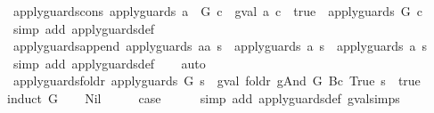 \begin{isabellebody}
\endisatagproof
{\isafoldproof}%
%
\isadelimproof
\isanewline
%
\endisadelimproof
\isanewline
{}\isamarkupfalse%
\ apply{\isacharunderscore}guards{\isacharunderscore}cons{\isacharcolon}\ {\isachardoublequoteopen}apply{\isacharunderscore}guards\ {\isacharparenleft}a\ {\isacharhash}\ G{\isacharparenright}\ c\ {\isacharequal}\ {\isacharparenleft}gval\ a\ c\ {\isacharequal}\ true\ {\isasymand}\ apply{\isacharunderscore}guards\ G\ c{\isacharparenright}{\isachardoublequoteclose}\isanewline
%
\isadelimproof
\ \ %
\endisadelimproof
%
\isatagproof
{}\isamarkupfalse%
\ {\isacharparenleft}simp\ add{\isacharcolon}\ apply{\isacharunderscore}guards{\isacharunderscore}def{\isacharparenright}%
\endisatagproof
{\isafoldproof}%
%
\isadelimproof
\isanewline
%
\endisadelimproof
\isanewline
{}\isamarkupfalse%
\ apply{\isacharunderscore}guards{\isacharunderscore}append{\isacharcolon}\ {\isachardoublequoteopen}apply{\isacharunderscore}guards\ {\isacharparenleft}a{\isacharat}a{\isacharprime}{\isacharparenright}\ s\ {\isacharequal}\ {\isacharparenleft}apply{\isacharunderscore}guards\ a\ s\ {\isasymand}\ apply{\isacharunderscore}guards\ a{\isacharprime}\ s{\isacharparenright}{\isachardoublequoteclose}\isanewline
%
\isadelimproof
\ \ %
\endisadelimproof
%
\isatagproof
{}\isamarkupfalse%
\ {\isacharparenleft}simp\ add{\isacharcolon}\ apply{\isacharunderscore}guards{\isacharunderscore}def{\isacharparenright}\isanewline
\ \ \isamarkupfalse%
\ auto%
\endisatagproof
{\isafoldproof}%
%
\isadelimproof
\isanewline
%
\endisadelimproof
\isanewline
{}\isamarkupfalse%
\ apply{\isacharunderscore}guards{\isacharunderscore}foldr{\isacharcolon}\ {\isachardoublequoteopen}apply{\isacharunderscore}guards\ G\ s\ {\isacharequal}\ {\isacharparenleft}gval\ {\isacharparenleft}foldr\ gAnd\ G\ {\isacharparenleft}Bc\ True{\isacharparenright}{\isacharparenright}\ s\ {\isacharequal}\ true{\isacharparenright}{\isachardoublequoteclose}\isanewline
%
\isadelimproof
%
\endisadelimproof
%
\isatagproof
{}\isamarkupfalse%
{\isacharparenleft}induct\ G{\isacharparenright}\isanewline
\ \ \isamarkupfalse%
\ Nil\isanewline
\ \ \isamarkupfalse%
\ \isamarkupfalse%
\ {\isacharquery}case\isanewline
\ \ \ \ \isamarkupfalse%
\ {\isacharparenleft}simp\ add{\isacharcolon}\ apply{\isacharunderscore}guards{\isacharunderscore}def\ gval{\isachardot}simps{\isacharparenright}\isanewline
{}\isamarkupfalse%
\isanewline
\ \ \isamarkupfalse%

\end{isabellebody}
